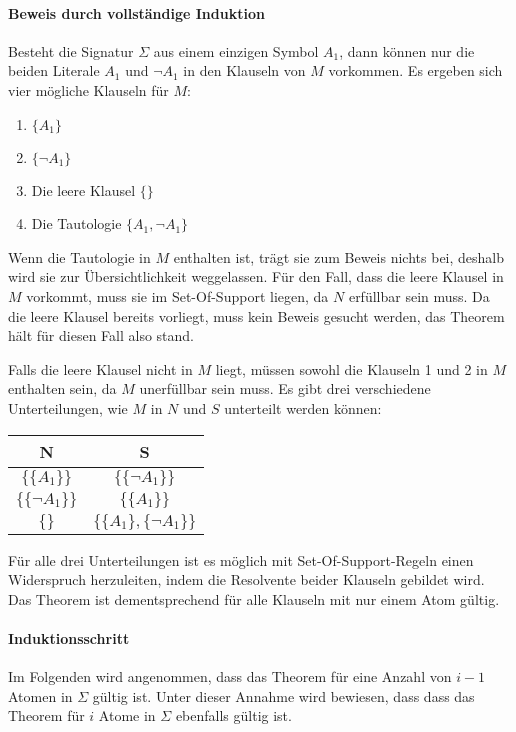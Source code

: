 \paragraph{Beweis durch vollständige Induktion}
Besteht die Signatur $\Sigma$ aus einem einzigen Symbol $A_1$, dann können nur die beiden Literale $A_1$ und $\neg A_1$ in den Klauseln von $M$ vorkommen.
Es ergeben sich vier mögliche Klauseln für $M$: 
\begin{enumerate}
	\item $\{A_1\}$
	\item $\{\neg A_1\}$
	\item Die leere Klausel $\{\}$
	\item Die Tautologie $\{A_1,\neg A_1\}$
\end{enumerate}
Wenn die Tautologie in $M$ enthalten ist, trägt sie zum Beweis nichts bei, deshalb wird sie zur Übersichtlichkeit weggelassen.
Für den Fall, dass die leere Klausel in $M$ vorkommt, muss sie im Set-Of-Support liegen, da $N$ erfüllbar sein muss. Da die leere Klausel bereits vorliegt, muss kein Beweis gesucht werden, das Theorem hält für diesen Fall also stand. 

Falls die leere Klausel nicht in $M$ liegt, müssen sowohl die Klauseln 1 und 2 in $M$ enthalten sein, da $M$ unerfüllbar sein muss. Es gibt drei verschiedene Unterteilungen, wie $M$ in $N$ und $S$ unterteilt werden können:
\begin{table}[h]
	\centering
	\begin{tabular}{c|c}
		N & S \\ \hline
		$\big\{\{A_1\}\big\}$ & $\big\{\{\neg A_1\}\big\}$ \\
		$\big\{\{\neg A_1\}\big\}$ & $\big\{\{A_1\}\big\}$ \\	
		$\big\{\big\}$ & $\big\{\{A_1\},\{\neg A_1\}\big\}$
	\end{tabular}
\end{table}

Für alle drei Unterteilungen ist es möglich mit Set-Of-Support-Regeln einen Widerspruch herzuleiten, indem die Resolvente beider Klauseln gebildet wird. Das Theorem ist dementsprechend für alle Klauseln mit nur einem Atom gültig.

\paragraph{Induktionsschritt} Im Folgenden wird angenommen, dass das Theorem für eine Anzahl von $i-1$ Atomen in $\Sigma$ gültig ist. Unter dieser Annahme wird bewiesen, dass dass das Theorem für $i$ Atome in $\Sigma$ ebenfalls gültig ist.


